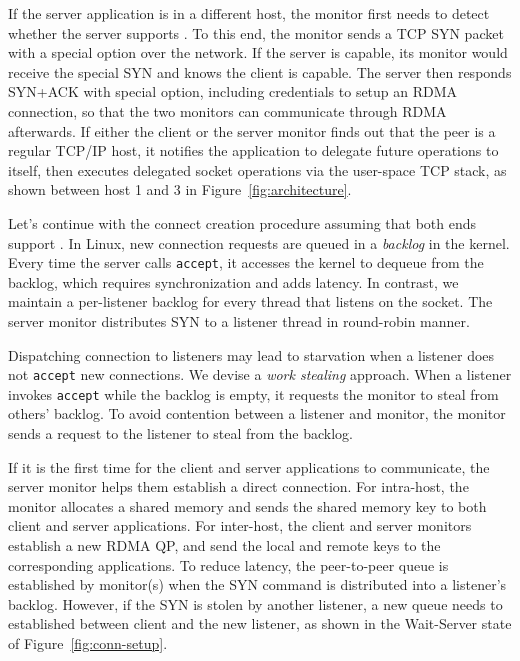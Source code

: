 If the server application is in a different host, the monitor first needs to detect whether the server supports \sys{}.
To this end, the monitor sends a TCP SYN packet with a special option over the network.
If the server is \sys{} capable, its monitor would receive the special SYN and knows the client is \sys{} capable.
The server then responds SYN+ACK with special option, including credentials to setup an RDMA connection, so that the two monitors can communicate through RDMA afterwards.
If either the client or the server monitor finds out that the peer is a regular TCP/IP host, it notifies the application to delegate future operations to itself, 
then executes delegated socket operations via the user-space TCP stack, as shown between host 1 and 3 in Figure~\ref{fig:architecture}.

Let's continue with the connect creation procedure assuming that both ends support \sys{}.
In Linux, new connection requests are queued in a \emph{backlog} in the kernel.
Every time the server calls \texttt{accept}, it accesses the kernel to dequeue from the backlog, which requires synchronization and adds latency.
In contrast, we maintain a per-listener backlog for every thread that listens on the socket.
The server monitor distributes SYN to a listener thread in round-robin manner.

Dispatching connection to listeners may lead to starvation when a listener does not \texttt{accept} new connections.
We devise a \textit{work stealing} approach.
When a listener invokes \texttt{accept} while the backlog is empty, it requests the monitor to steal from others' backlog.
To avoid contention between a listener and monitor, the monitor sends a request to the listener to steal from the backlog.

If it is the first time for the client and server applications to communicate, the server monitor helps them establish a direct connection.
For intra-host, the monitor allocates a shared memory and sends the shared memory key to both client and server applications.
For inter-host, the client and server monitors establish a new RDMA QP, and send the local and remote keys to the corresponding applications.
To reduce latency, the peer-to-peer queue is established by monitor(s) when the SYN command is distributed into a listener's backlog.
However, if the SYN is stolen by another listener, a new queue needs to established between client and the new listener, as shown in the Wait-Server state of Figure~\ref{fig:conn-setup}.

